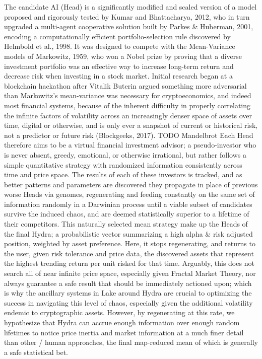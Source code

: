 \documentclass[11pt, a4paper]{awesome-cv}
\begin{document}
\begin{cvletter}
The candidate AI (Head) is a significantly modified and scaled version of a model proposed and rigorously tested by Kumar and Bhattacharya, 2012, who in turn upgraded a multi-agent cooperative solution built by Parkes \& Huberman, 2001, encoding a computationally efficient portfolio-selection rule discovered by Helmbold et al., 1998. It was designed to compete with the Mean-Variance models of Markowitz, 1959, who won a Nobel prize by proving that a diverse investment portfolio was an effective way to increase long-term return and decrease risk when investing in a stock market. Initial research began at a blockchain hackathon after Vitalik Buterin argued something more adversarial than Markowitz’s mean-variance was necessary for cryptoeconomics, and indeed most financial systems, because of the inherent difficulty in properly correlating the infinite factors of volatility across an increasingly denser space of assets over time, digital or otherwise, and is only ever a snapshot of current or historical risk, not a predictor or future risk (Blockgeeks, 2017). TODO Mandelbrot
Each Head therefore aims to be a virtual financial investment advisor; a pseudo-investor who is never absent, greedy, emotional, or otherwise irrational, but rather follows a simple quantitative strategy with randomized information consistently across time and price space. The results of each of these investors is tracked, and as better patterns and parameters are discovered they propagate in place of previous worse Heads via genomes, regenerating and feeding constantly on the same set of information randomly in a Darwinian process until a viable subset of candidates survive the induced chaos, and are deemed statistically superior to a lifetime of their competitors. This naturally selected mean strategy make up the Heads of the final Hydra; a probabilistic vector summarizing a high alpha \& risk adjusted position, weighted by asset preference. Here, it stops regenerating, and returns to the user, given risk tolerance and price data, the discovered assets that represent the highest trending return per unit risked for that time.
Arguably, this does not search all of near infinite price space, especially given Fractal Market Theory, nor always guarantee a safe result that should be immediately actioned upon; which is why the ancillary systems in Lake around Hydra are crucial to optimizing the success in navigating this level of chaos, especially given the additional volatility endemic to cryptographic assets. However, by regenerating at this rate, we hypothesize that Hydra can accrue enough information over enough random lifetimes to notice price inertia and market information at a much finer detail than other / human approaches, the final map-reduced mean of which is generally a safe statistical bet.

\end{cvletter}
\end{document}
